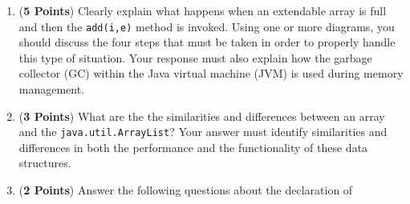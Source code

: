 \documentclass[12pt]{article}
\begin{document}
\begin{enumerate}
  \begin{enumerate}

  \item ({\bf 5 Points}) Clearly explain what happens when an
    extendable array is full and then the {\tt add(i,e)} method is
    invoked. Using one or more diagrams, you should discuss the four
    steps that must be taken in order to properly handle this type of
    situation.  Your response must also explain how the garbage
    collector (GC) within the Java virtual machine (JVM) is used
    during memory management.


  \item ({\bf 3 Points}) What are the the similarities and differences
    between an array and the {\tt java.util.ArrayList}?  Your answer
    must identify similarities and differences in both the performance
    and the functionality of these data structures.



  \item ({\bf 2 Points}) Answer the following questions about the declaration of


\end{enumerate}
\end{enumerate}
\end{document}
